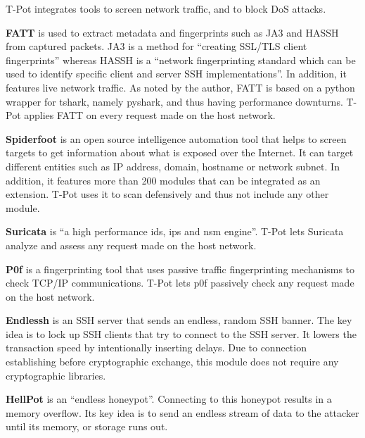 T-Pot integrates tools to screen network traffic, and to block DoS attacks.

\textbf{FATT} \cite{fatt2021} is used to extract metadata and fingerprints such as JA3 \cite{ja32021} and HASSH \cite{hassh2021} from captured packets.
JA3 is a method for \enquote{creating SSL/TLS client fingerprints} whereas HASSH is a \enquote{network fingerprinting standard which can be used to identify specific client and server SSH implementations}.
In addition, it features live network traffic.
As noted by the author, FATT is based on a python wrapper for tshark, namely pyshark, and thus having performance downturns.
T-Pot applies FATT on every request made on the host network.

\textbf{Spiderfoot} \cite{spiderfoot2021} is an open source intelligence automation tool that helps to screen targets to get information about what is exposed over the Internet.
It can target different entities such as IP address, domain, hostname or network subnet.
In addition, it features more than 200 modules that can be integrated as an extension.
T-Pot uses it to scan defensively and thus not include any other module.

\textbf{Suricata} \cite{suricata2021} is \enquote{a high performance \ac{ids}, \ac{ips} and \ac{nsm} engine}.
T-Pot lets Suricata analyze and assess any request made on the host network.

\textbf{P0f} \cite{p0f2021} is a fingerprinting tool that uses passive traffic fingerprinting mechanisms to check TCP/IP communications.
T-Pot lets p0f passively check any request made on the host network.

\textbf{Endlessh} \cite{endlessh2021} is an SSH server that sends an endless, random SSH banner.
The key idea is to lock up SSH clients that try to connect to the SSH server.
It lowers the transaction speed by intentionally inserting delays.
Due to connection establishing before cryptographic exchange, this module does not require any cryptographic libraries.

\textbf{HellPot} \cite{hellpot2021} is an \enquote{endless honeypot}.
Connecting to this honeypot results in a memory overflow.
Its key idea is to send an endless stream of data to the attacker until its memory, or storage runs out.


